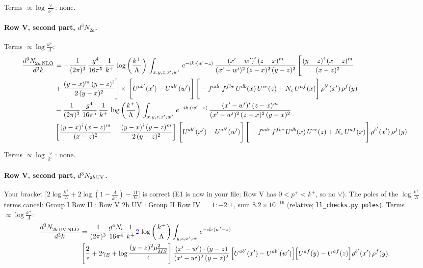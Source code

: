 \documentclass[10pt]{article}
\numberwithin{equation}{section}
\newcommand{\new}[1]{{\color{blue}#1}}
\begin{document}
\noindent Terms $\propto\log\frac{\vee}{k^+}$: none.

\paragraph{Row V, second part, $d^3N_{2a}$.}
\noindent Terms $\propto\log\frac{k^+}{\Lambda}$:
\begin{align}
    \frac{d^{3}N_{2a\,\rm NLO}^{\rm}}{d^{3}k}  & =    - \frac{1}{(2\pi)^{3}}\, \frac{g^{4}}{16\pi^{5}}\,\frac{1}{k^{+}}\,\log{\left(\frac{k^{+}}{\Lambda}\right)}\, \int_{x,y,z,x',w'}\, e^{-ik\cdot(w'-z)}\,\frac{(x'-w')^{i}\,(z-x)^{m}}{(x'-w')^{2}\,(z-x)^{2}\, (y-z)^{2}}\,\Bigg[\frac{(y-z)^{i}\,(x-z)^{m}}{(x-z)^{2}}\notag \\ & +\frac{(y-x)^{m}\,(y-z)^{i}}{2\,(y-x)^{2}}\Bigg]\times\, \Bigg[U^{ab'}(x')-U^{ab'}(w')\Bigg]\,\Bigg[-f^{adc}\,f^{fbe}\,U^{db}(x)\,U^{ce}(z)+N_{c}\,U^{af}(x)\Bigg]\,\rho^{b'}(x')\,\rho^{f}(y) \notag \\
& - \frac{1}{(2\pi)^{3}}\, \frac{g^{4}}{16\pi^{5}}\,\frac{1}{k^{+}}\,\log{\left(\frac{k^{+}}{\Lambda}\right)}\, \int_{x,y,z,x',w'}\,e^{-ik\cdot(w'-x)}\,\frac{(x'-w')^{i}\,(z-x)^{m}}{(x'-w')^{2}\,(z-x)^{2}\,(y-x)^{2}} \notag \\ &\left[\frac{(y-x)^{i}\,(x-z)^{m}}{(x-z)^{2}}-\frac{(y-x)^{i}\,(y-z)^{m}}{2\,(y-z)^{2}}\right]\, \Bigg[U^{ab'}(x')-U^{ab'}(w')\Bigg]\,\Bigg[-f^{adc}\,f^{fbe}\,U^{db}(x)\,U^{ce}(z)+N_{c}\,U^{af}(x)\Bigg]\,\rho^{b'}(x')\,\rho^{f}(y) \label{eq:J:G1V2a}
\end{align}

\noindent Terms $\propto\log\frac{\vee}{k^+}$: none.

\paragraph{Row V, second part, $d^3N_{2b\,\rm UV}$.}
Your bracket $\big[2\log\frac{k^+}{\Lambda}+2\log(1-\frac{\Lambda}{k^+})-\frac{11}{6}\big]$ is correct (E1 is now in your file; Row V has $0<p^+<k^+$, so no $\vee$). The poles of the $\log\frac{k^+}{\Lambda}$ terms cancel: Group I Row II : Row V 2b UV : Group II Row IV $=1:-2:1$, sum $8.2\times10^{-16}$ (relative; \texttt{ll\_checks.py poles}).
\noindent Terms $\propto\log\frac{k^+}{\Lambda}$:
\begin{align}
\frac{d^{3}N_{2b\,\rm UV\, NLO}^{\rm}}{d^{3}k} & =  \frac{1}{(2\pi)^{3}}\,\frac{g^{4}N_{c}}{16\pi^{4}}\,\frac{1}{k^{+}}
\new{2}\,\log{\left(\frac{k^{+}}{\Lambda}\right)}\int_{y,z,x',w'}e^{-ik\cdot(w'-z)}\notag \\ & \left[\frac{2}{\epsilon}+2\gamma_{E}+\log\frac{(y-z)^{2}\mu^{2}_{\overline{MS}}}{4}\right]
\frac{(x'-w')\cdot(y-z)}{(x'-w')^{2}\,(y-z)^{2}}\, \Big[U^{ab'}(x')-U^{ab'}(w')\Big]\Big[U^{af}(y)-U^{af}(z)\Big]\rho^{b'}(x')\,\rho^{f}(y). \label{eq:J:G1V2bUV}
\end{align}
\end{document}
